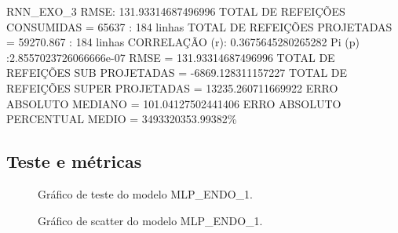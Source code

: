 \documentclass[	12pt, Times, openright, twoside, a4paper, english, brazil]{abntex2}
\begin{document}
            RNN\_EXO\_3\newline
            RMSE:  131.93314687496996\newline
            TOTAL DE REFEIÇÕES CONSUMIDAS = 65637 : 184 linhas\newline
            TOTAL DE REFEIÇÕES PROJETADAS = 59270.867 : 184 linhas\newline
            CORRELAÇÃO (r): 0.3675645280265282 Pi (p) :2.8557023726066666e-07\newline
            RMSE = 131.93314687496996\newline
            TOTAL DE REFEIÇÕES SUB PROJETADAS = -6869.128311157227\newline
            TOTAL DE REFEIÇÕES SUPER PROJETADAS = 13235.260711669922\newline
            ERRO ABSOLUTO MEDIANO = 101.04127502441406\newline
            ERRO ABSOLUTO PERCENTUAL MEDIO = 3493320353.99382\% \newline
    	    
    	    
    	\subsection{Teste e métricas}
            \begin{figure}[!ht]
              \caption{Gráfico de teste do modelo MLP\_ENDO\_1. \label{fig:case2_mlp_endo1_test} }
            \end{figure}
            \begin{figure}[!ht]
              \caption{Gráfico de scatter do modelo MLP\_ENDO\_1. \label{fig:case2_mlp_endo1_test_scatter} }
            \end{figure}
              
\end{document}
